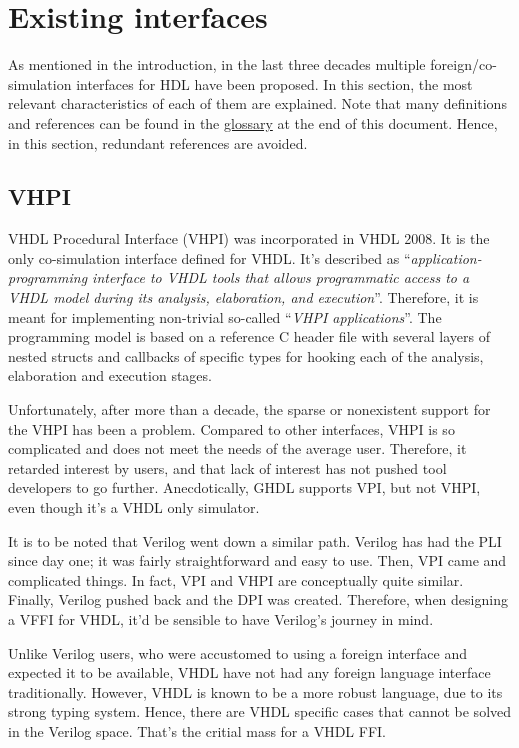 \documentclass[
]{article}
\begin{document}
\hypertarget{existing-interfaces}{%
\section{Existing interfaces}\label{existing-interfaces}}

As mentioned in the introduction, in the last three decades multiple foreign/co-simulation interfaces for HDL have been proposed. In this section, the most relevant characteristics of each of them are explained. Note that many definitions and references can be found in the \protect\hyperlink{glossary}{glossary} at the end of this document. Hence, in this section, redundant references are avoided.

\hypertarget{vhpi}{%
\subsection{VHPI}\label{vhpi}}

VHDL Procedural Interface (VHPI) was incorporated in VHDL 2008. It is the only co-simulation interface defined for VHDL. It's described as ``\emph{application-programming interface to VHDL tools that allows programmatic access to a VHDL model during its analysis, elaboration, and execution}''. Therefore, it is meant for implementing non-trivial so-called ``\emph{VHPI applications}''. The programming model is based on a reference C header file with several layers of nested structs and callbacks of specific types for hooking each of the analysis, elaboration and execution stages.

Unfortunately, after more than a decade, the sparse or nonexistent support for the VHPI has been a problem. Compared to other interfaces, VHPI is so complicated and does not meet the needs of the average user. Therefore, it retarded interest by users, and that lack of interest has not pushed tool developers to go further. Anecdotically, GHDL supports VPI, but not VHPI, even though it's a VHDL only simulator.

It is to be noted that Verilog went down a similar path. Verilog has had the PLI since day one; it was fairly straightforward and easy to use. Then, VPI came and complicated things. In fact, VPI and VHPI are conceptually quite similar. Finally, Verilog pushed back and the DPI was created. Therefore, when designing a VFFI for VHDL, it'd be sensible to have Verilog's journey in mind.

Unlike Verilog users, who were accustomed to using a foreign interface and expected it to be available, VHDL have not had any foreign language interface traditionally. However, VHDL is known to be a more robust language, due to its strong typing system. Hence, there are VHDL specific cases that cannot be solved in the Verilog space. That's the critial mass for a VHDL FFI.
\end{document}
